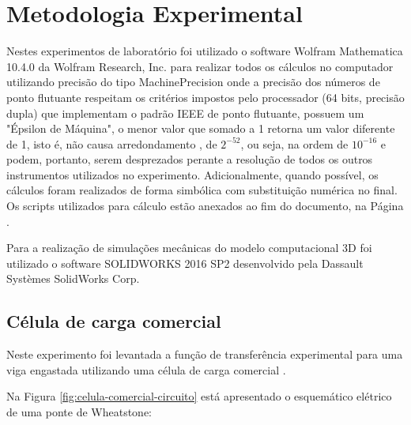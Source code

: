 \documentclass[a4paper]{instrumentacao}
\begin{document}
\chapter{Metodologia Experimental}
Nestes experimentos de laboratório foi utilizado o software Wolfram Mathematica 10.4.0 da Wolfram Research, Inc. para realizar todos os cálculos no computador utilizando precisão do tipo MachinePrecision\cite{mathematica-numerial-precision} onde a precisão dos números de ponto flutuante respeitam os critérios impostos pelo processador (64 bits, precisão dupla) que implementam o padrão IEEE de ponto flutuante, possuem um "Épsilon de Máquina", o menor valor que somado a 1 retorna um valor diferente de 1, isto é, não causa arredondamento \cite{wikipedia-epsilon}, de $2^{-52}$, ou seja, na ordem de $10^{-16}$ e podem, portanto, serem desprezados perante a resolução de todos os outros instrumentos utilizados no experimento. Adicionalmente, quando possível, os cálculos foram realizados de forma simbólica com substituição numérica no final. Os scripts utilizados para cálculo estão anexados ao fim do documento, na Página \pageref{ch:attachments}.

Para a realização de simulações mecânicas do modelo computacional 3D foi utilizado o software SOLIDWORKS 2016 SP2 desenvolvido pela Dassault Systèmes SolidWorks Corp.

\section{Célula de carga comercial}

Neste experimento foi levantada a função de transferência experimental para uma viga engastada utilizando uma célula de carga comercial .

Na Figura \ref{fig:celula-comercial-circuito} está apresentado o esquemático elétrico de uma ponte de Wheatstone:
\end{document}
